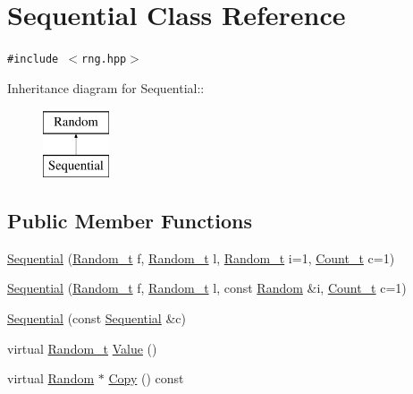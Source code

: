 \hypertarget{classSequential}{
\section{Sequential Class Reference}
\label{classSequential}
}
{\tt \#include $<$rng.hpp$>$}

Inheritance diagram for Sequential::\begin{figure}[H]
\begin{center}
\leavevmode
\includegraphics[height=2cm]{classSequential}
\end{center}
\end{figure}
\subsection*{Public Member Functions}
\begin{CompactItemize}
\item 
\hyperlink{classSequential_0b22b2f44a9805cbfe5007cc73874617}{Sequential} (\hyperlink{rng_8hpp_ad41e7f5d86b1109b6a6a032c86cdd3f}{Random\_\-t} f, \hyperlink{rng_8hpp_ad41e7f5d86b1109b6a6a032c86cdd3f}{Random\_\-t} l, \hyperlink{rng_8hpp_ad41e7f5d86b1109b6a6a032c86cdd3f}{Random\_\-t} i=1, \hyperlink{common-defs_8hpp_bdd4d02aefa61ef2e943e2c6a09566c6}{Count\_\-t} c=1)
\item 
\hyperlink{classSequential_67f7f4c3a03f10d2c155f414a2bdbe12}{Sequential} (\hyperlink{rng_8hpp_ad41e7f5d86b1109b6a6a032c86cdd3f}{Random\_\-t} f, \hyperlink{rng_8hpp_ad41e7f5d86b1109b6a6a032c86cdd3f}{Random\_\-t} l, const \hyperlink{classRandom}{Random} \&i, \hyperlink{common-defs_8hpp_bdd4d02aefa61ef2e943e2c6a09566c6}{Count\_\-t} c=1)
\item 
\hyperlink{classSequential_82b76aef339451a4c79c460342d169f0}{Sequential} (const \hyperlink{classSequential}{Sequential} \&c)
\item 
virtual \hyperlink{rng_8hpp_ad41e7f5d86b1109b6a6a032c86cdd3f}{Random\_\-t} \hyperlink{classSequential_d3a1aca0362e90ff3e8f8fc9c96152d8}{Value} ()
\item 
virtual \hyperlink{classRandom}{Random} $\ast$ \hyperlink{classSequential_8a26193ea7fa5a8d7266c9a963028fe1}{Copy} () const 
\end{CompactItemize}


